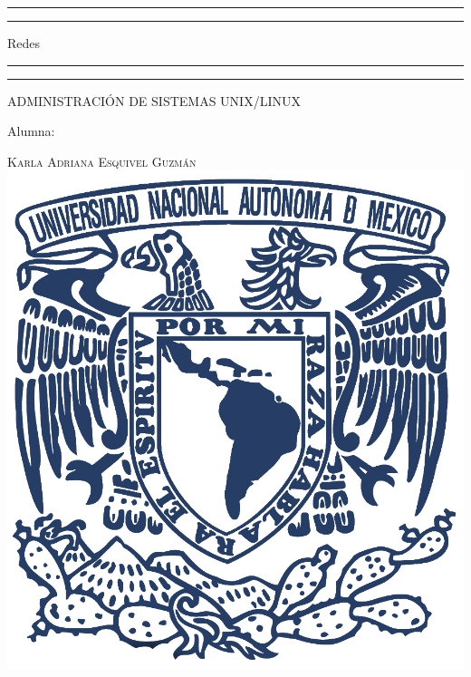 \documentclass[a4paper, 11pt, oneside]{article}
\begin{document}
 

\begin{titlepage} 

	\centering 
	
	\scshape 
	
	\vspace*{\baselineskip} 
	
	
	
	\rule{\textwidth}{1.6pt}\vspace*{-\baselineskip}\vspace*{2pt} 
	\rule{\textwidth}{0.4pt} 
	
	\vspace{0.75\baselineskip} 
	
	{\LARGE Redes}	
	\vspace{0.75\baselineskip} 
	
	\rule{\textwidth}{0.4pt}\vspace*{-\baselineskip}\vspace{3.2pt}
	\rule{\textwidth}{1.6pt} 
	
	\vspace{2\baselineskip} 
	

	ADMINISTRACIÓN DE SISTEMAS UNIX/LINUX
	
	\vspace*{3\baselineskip} 
	
	
	
	Alumna:
	
	\vspace{0.5\baselineskip} 
	
	{\scshape\Large Karla Adriana Esquivel Guzmán \\} 
	\vspace{0.5\baselineskip} 
	\vfill
	\includegraphics{unam.jpg}
	

\end{titlepage}
\end{document}
